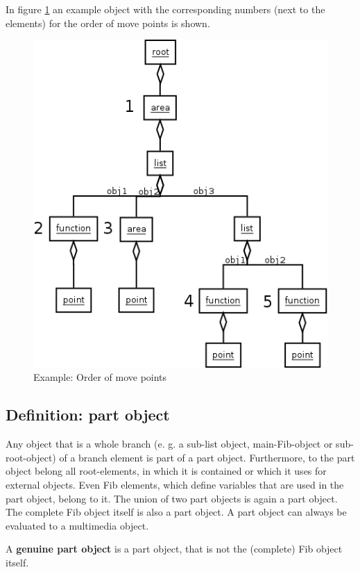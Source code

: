 In figure \ref{figOrderMovePoints} an example object with the corresponding numbers (next to the elements) for the order of move points is shown.

\begin{figure}[htbp]
\begin{center}
  \includegraphics[scale=0.5]{order_move_points}
\end{center}
\caption{Example: Order of move points}
\label{figOrderMovePoints}
\end{figure}


\subsection{Definition: part object}

Any object that is a whole branch (e. g. a sub-list object, main-Fib-object or sub-root-object) of a branch element is part of a part object. Furthermore, to the part object belong all root-elements, in which it is contained or which it uses for external objects. Even Fib elements, which define variables that are used in the part object, belong to it.
The union of two part objects is again a part object.
The complete Fib object itself is also a part object.
A part object can always be evaluated to a multimedia object.

A \textbf{genuine part object} is a part object, that is not the (complete) Fib object itself.


